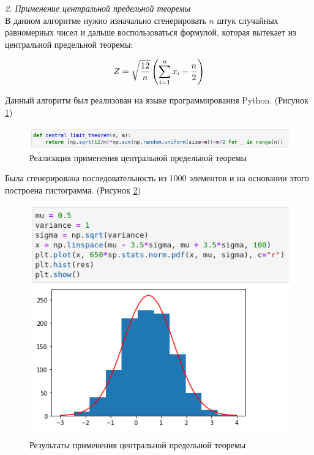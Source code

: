 \documentclass[14pt,fleqn]{extarticle}
\begin{document}
	\vspace{1cm}
	
	\textit{2. Применение центральной предельной теоремы}\\
	
	В данном алгоритме нужно изначально сгенерировать $n$ штук случайных равномерных чисел и дальше воспользоваться формулой, которая вытекает из центральной предельной теоремы:
	\begin{ceqn}
	\begin{align*}
		Z = \sqrt{\dfrac{12}{n}}\left(\smashoperator[r]{\sum_{i=1}^{n}} x_i - \dfrac{n}{2}\right)
	\end{align*}
	\end{ceqn}
	
	Данный алгоритм был реализован на языке программирования Python. (Рисунок \ref{fig:central_limit_theorem_code})
	\begin{figure}[h]
		\centering \includegraphics[scale=0.65]{central_limit_theorem_code}
		\caption{Реализация применения центральной предельной теоремы}
		\label{fig:central_limit_theorem_code}
	\end{figure}

	\newpage
	Была сгенерирована последовательность из 1000 элементов и на основании этого построена гистограмма. (Рисунок \ref{fig:central_limit_theorem_result})
	
	\begin{figure}[h]
		\centering \includegraphics[scale=0.6]{central_limit_theorem_result}
		\caption{Результаты применения центральной предельной теоремы}
		\label{fig:central_limit_theorem_result}
	\end{figure}
	
\end{document}
